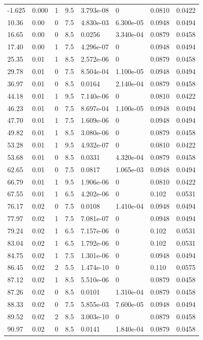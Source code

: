 \documentclass[preview]{standalone}
\begin{document}
{{\begin{tabular}{L{1.2cm}C{1.2cm} C{0.3cm}C{0.5cm} C{1.4cm}C{1.4cm} C{1.4cm}C{1.4cm}}
  -1.625  &  0.000  & 1     & 9.5 &  3.793e-08  & 0  & 0.0810 &  0.0422   \\ 
  10.36  &  0.00  & 0     & 7.5 &  4.830e-03  & 6.300e-05  & 0.0948 &  0.0494   \\ 
  16.65  &  0.00  & 0     & 8.5 &  0.0256  & 3.340e-04  & 0.0879 &  0.0458   \\ 
  17.40  &  0.00  & 1     & 7.5 &  4.296e-07  & 0  & 0.0948 &  0.0494   \\ 
  25.35  &  0.01  & 1     & 8.5 &  2.572e-06  & 0  & 0.0879 &  0.0458   \\ 
  29.78  &  0.01  & 0     & 7.5 &  8.504e-04  & 1.100e-05  & 0.0948 &  0.0494   \\ 
  36.97  &  0.01  & 0     & 8.5 &  0.0164  & 2.140e-04  & 0.0879 &  0.0458   \\ 
  44.18  &  0.01  & 1     & 9.5 &  7.140e-06  & 0  & 0.0810 &  0.0422   \\ 
  46.23  &  0.01  & 0     & 7.5 &  8.697e-04  & 1.100e-05  & 0.0948 &  0.0494   \\ 
  47.70  &  0.01  & 1     & 7.5 &  1.609e-06  & 0  & 0.0948 &  0.0494   \\ 
  49.82  &  0.01  & 1     & 8.5 &  3.080e-06  & 0  & 0.0879 &  0.0458   \\ 
  53.28  &  0.01  & 1     & 9.5 &  4.932e-07  & 0  & 0.0810 &  0.0422   \\ 
  53.68  &  0.01  & 0     & 8.5 &  0.0331  & 4.320e-04  & 0.0879 &  0.0458   \\ 
  62.65  &  0.01  & 0     & 7.5 &  0.0817  & 1.065e-03  & 0.0948 &  0.0494   \\ 
  66.79  &  0.01  & 1     & 9.5 &  1.906e-06  & 0  & 0.0810 &  0.0422   \\ 
  67.55  &  0.01  & 1     & 6.5 &  4.202e-06  & 0  & 0.102 &  0.0531   \\ 
  76.17  &  0.02  & 0     & 7.5 &  0.0108  & 1.410e-04  & 0.0948 &  0.0494   \\ 
  77.97  &  0.02  & 1     & 7.5 &  7.081e-07  & 0  & 0.0948 &  0.0494   \\ 
  79.24  &  0.02  & 1     & 6.5 &  7.157e-06  & 0  & 0.102 &  0.0531   \\ 
  83.04  &  0.02  & 1     & 6.5 &  1.792e-06  & 0  & 0.102 &  0.0531   \\ 
  84.75  &  0.02  & 1     & 7.5 &  1.301e-06  & 0  & 0.0948 &  0.0494   \\ 
  86.45  &  0.02  & 2     & 5.5 &  1.474e-10  & 0  & 0.110 &  0.0575   \\ 
  87.12  &  0.02  & 1     & 8.5 &  5.510e-06  & 0  & 0.0879 &  0.0458   \\ 
  87.26  &  0.02  & 0     & 8.5 &  0.0101  & 1.310e-04  & 0.0879 &  0.0458   \\ 
  88.33  &  0.02  & 0     & 7.5 &  5.855e-03  & 7.600e-05  & 0.0948 &  0.0494   \\ 
  89.52  &  0.02  & 2     & 8.5 &  3.003e-10  & 0  & 0.0879 &  0.0458   \\ 
  90.97  &  0.02  & 0     & 8.5 &  0.0141  & 1.840e-04  & 0.0879 &  0.0458   \\ 
\hline 
\end{tabular} 

}}
\end{document}
